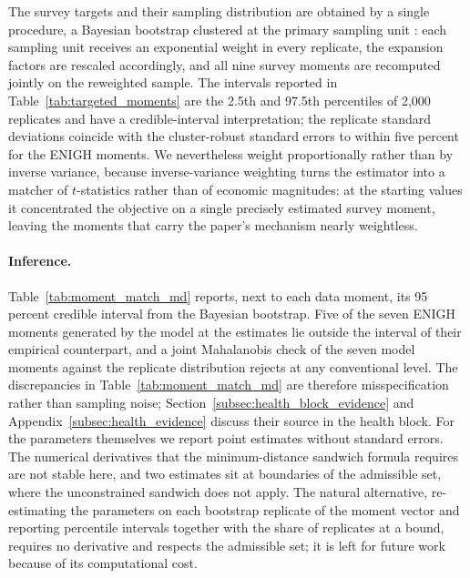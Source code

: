 

The survey targets and their sampling distribution are obtained by a single procedure, a Bayesian bootstrap clustered at the primary sampling unit \citep{Rubin1981, AndrewsMoonShapiro2026}: each sampling unit receives an exponential weight in every replicate, the expansion factors are rescaled accordingly, and all nine survey moments are recomputed jointly on the reweighted sample. The intervals reported in Table~\ref{tab:targeted_moments} are the 2.5th and 97.5th percentiles of 2,000 replicates and have a credible-interval interpretation; the replicate standard deviations coincide with the cluster-robust standard errors to within five percent for the ENIGH moments. We nevertheless weight proportionally rather than by inverse variance, because inverse-variance weighting turns the estimator into a matcher of $t$-statistics rather than of economic magnitudes: at the starting values it concentrated the objective on a single precisely estimated survey moment, leaving the moments that carry the paper's mechanism nearly weightless.


\paragraph{Inference.} Table~\ref{tab:moment_match_md} reports, next to each data moment, its 95 percent credible interval from the Bayesian bootstrap. Five of the seven ENIGH moments generated by the model at the estimates lie outside the interval of their empirical counterpart, and a joint Mahalanobis check of the seven model moments against the replicate distribution rejects at any conventional level. The discrepancies in Table~\ref{tab:moment_match_md} are therefore misspecification rather than sampling noise; Section~\ref{subsec:health_block_evidence} and Appendix~\ref{subsec:health_evidence} discuss their source in the health block. For the parameters themselves we report point estimates without standard errors. The numerical derivatives that the minimum-distance sandwich formula requires are not stable here, and two estimates sit at boundaries of the admissible set, where the unconstrained sandwich does not apply. The natural alternative, re-estimating the parameters on each bootstrap replicate of the moment vector and reporting percentile intervals together with the share of replicates at a bound, requires no derivative and respects the admissible set; it is left for future work because of its computational cost.

